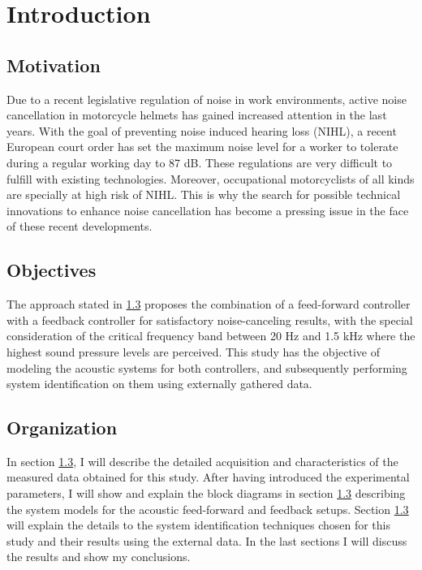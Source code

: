 


\section{Introduction}

\subsection{Motivation}
Due to a recent legislative regulation of noise in work environments, active noise cancellation in motorcycle helmets has gained increased attention in the last years. With the goal of preventing noise induced hearing loss (NIHL), a recent European  court order has set the maximum noise level for a worker to tolerate during a regular working day to 87 dB. These regulations are very difficult to fulfill with existing technologies. Moreover, occupational motorcyclists of all kinds are specially at high risk of NIHL. This is why the search for possible technical innovations to enhance noise cancellation has become a pressing issue in the face of these recent developments. 

\subsection{Objectives}

The approach stated in \ref{} proposes the combination of a feed-forward controller with a feedback controller for satisfactory noise-canceling results, with the special consideration of the critical frequency band between 20 Hz and 1.5 kHz where the highest sound pressure levels are perceived. This study has the objective of modeling the acoustic systems for both controllers, and subsequently performing system identification on them using externally gathered data.

\subsection{Organization}

In section \ref{}, I will describe the detailed acquisition and characteristics of the measured data obtained for this study. After having introduced the experimental parameters, I will show and explain the block diagrams in section \ref{} describing the system models for the acoustic feed-forward and feedback setups. Section \ref{} will explain the details to the system identification techniques chosen for this study and their results using the external data. In the last sections I will discuss the results and show my conclusions.


